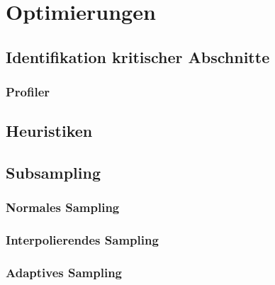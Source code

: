 \section{Optimierungen}
\subsection{Identifikation kritischer Abschnitte}
\subsubsection{Profiler}

\subsection{Heuristiken}

\subsection{Subsampling}
\subsubsection{Normales Sampling}
\subsubsection{Interpolierendes Sampling}
\subsubsection{Adaptives Sampling}
